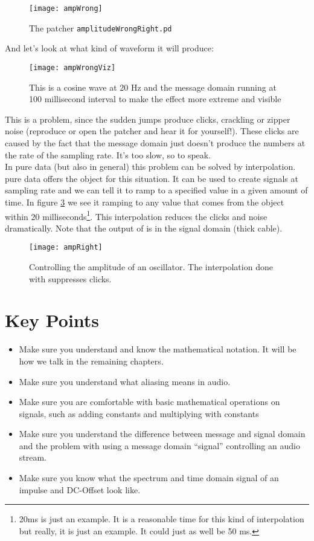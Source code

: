 \begin{figure}[H]
	\centering
	\texttt{[image: ampWrong]}
	\caption[patcher \texttt{amplitudeWrongRight.pd}]
	{The patcher \texttt{amplitudeWrongRight.pd} }
	\label{fig:label}
\end{figure}


And let's look at what kind of waveform it will produce:

\begin{figure}[H]
	\centering
	\texttt{[image: ampWrongViz]}
	\caption[Amplitude control, message domain ]
	{This is a cosine wave at 20 Hz and the message domain running at 100 millisecond interval to make the effect more extreme and visible}
	\label{fig:label}
\end{figure}


This is a problem, since the sudden jumps produce clicks, crackling or zipper noise (reproduce or open the patcher and hear it for yourself!). These clicks are caused by the fact that the message domain just doesn't produce
the numbers at the rate of the sampling rate. It's too slow, so to speak.\\
In pure data (but also in general) this problem can be solved by interpolation. pure data offers the  object for this situation. It can be used to create signals at sampling rate and we can tell it to ramp to a specified value in a given amount of time. In figure \ref{fig:ampRight} we see it ramping to any value that comes from the  object within 20 milliseconds\footnote{20ms is just an example. It is a reasonable time for this kind of interpolation but really, it is just an example. It could just as well be 50 ms.}. This interpolation reduces the clicks and noise dramatically. Note that the output of  is in the signal domain (thick cable).

\begin{figure}[H]
	\centering
	\texttt{[image: ampRight]}
	\caption[Amplitude control, signal domain]
	{Controlling the amplitude of an oscillator. The interpolation done with  suppresses clicks. }
	\label{fig:ampRight}
\end{figure}


\section{Key Points}
\begin{itemize}
	\item Make sure you understand and know the mathematical notation. It will be how we talk in the remaining chapters.
	\item Make sure you understand what aliasing means in audio.
	\item Make sure you are comfortable with basic mathematical operations on signals, such as adding constants and multiplying with constants
	\item Make sure you understand the difference between message and signal domain and the problem with using a message domain ``signal'' controlling an audio stream.
	\item Make sure you know what the spectrum and time domain signal of an impulse and DC-Offset look like.
\end{itemize}
